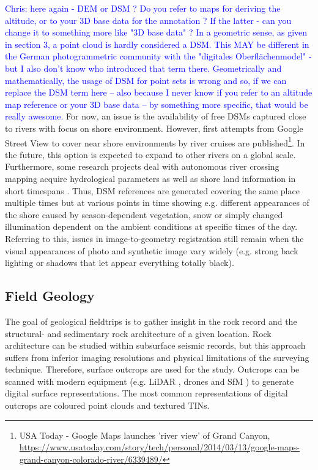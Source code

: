 \documentclass[review]{elsarticle}
\begin{document}
\textcolor{blue}{Chris: here again - DEM or DSM ? Do you refer to maps for deriving the altitude, or to your 3D base data for the annotation ? If the latter - can you change it to something more like "3D base data" ? In a geometric sense, as given in section 3, a point cloud is hardly considered a DSM. This MAY be different in the German photogrammetric community with the "digitales Oberflächenmodel" - but I also don't know who introduced that term there. Geometrically and mathematically, the usage of DSM for point sets is wrong and so, if we can replace the DSM term here -- also because I never know if you refer to an altitude map reference or your 3D base data -- by something more specific, that would be really awesome.}
For now, an issue is the availability of free \glspl{DSM} captured close to rivers with focus on shore environment. However, first attempts from Google Street View to cover near shore environments by river cruises are published\footnote{USA Today - Google Maps launches 'river view' of Grand Canyon, \url{https://www.usatoday.com/story/tech/personal/2014/03/13/google-maps-grand-canyon-colorado-river/6339489/}}. In the future, this option is expected to expand to other rivers on a global scale. Furthermore, some research projects deal with autonomous river crossing mapping acquire hydrological parameters as well as shore land information in short timespans \cite{Sardemann2018}. Thus, \gls{DSM} references are generated covering the same place multiple times but at various points in time showing e.g. different appearances of the shore caused by season-dependent vegetation, snow or simply changed illumination dependent on the ambient conditions at specific times of the day. Referring to this, issues in image-to-geometry registration still remain when the visual appearances of photo and synthetic image vary widely (e.g. strong back lighting or shadows that let appear everything totally black). 







\subsection{Field Geology}
\label{sec:applications:field_geology}

The goal of geological fieldtrips is to gather insight in the rock record and the structural- and sedimentary rock architecture of a given location. Rock architecture can be studied within subsurface seismic records, but this approach suffers from inferior imaging resolutions and physical limitations of the surveying technique. Therefore, surface outcrops are used for the study. Outcrops can be scanned with modern equipment (e.g. \gls{LiDAR} \cite{Buckley2008a,Buckley2010}, drones \cite{Dewez2015} and \gls{SfM} \cite{Chandler2016}) to generate digital surface representations. The most common representations of digital outcrops are coloured point clouds and textured \glspl{TIN}.
\end{document}

